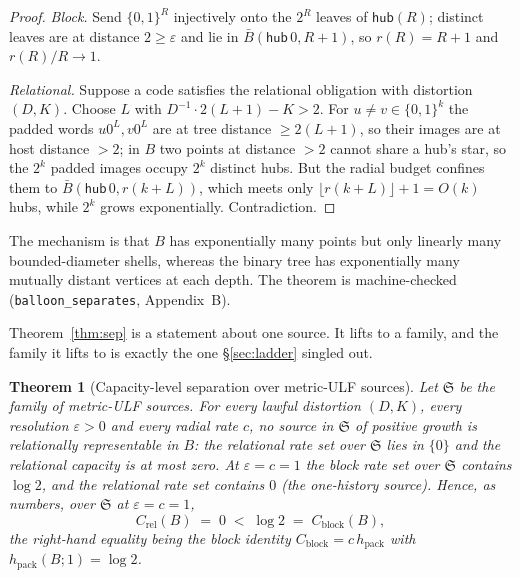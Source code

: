\documentclass[11pt,reqno]{amsart}
\theoremstyle{plain}
\newtheorem{theorem}{Theorem}[section]
\theoremstyle{definition}
\newcommand{\hpack}{h_{\mathrm{pack}}}
\newcommand{\Crel}{C_{\mathrm{rel}}}
\newcommand{\Cblock}{C_{\mathrm{block}}}
\newcommand{\eps}{\varepsilon}
\begin{document}
\begin{proof}
\emph{Block.} Send $\{0,1\}^R$ injectively onto the $2^R$ leaves of $\mathsf{hub}(R)$; distinct leaves are at distance $2\ge\eps$ and lie in $\bar B(\mathsf{hub}\,0,R+1)$, so $r(R)=R+1$ and $r(R)/R\to1$.

\emph{Relational.} Suppose a code satisfies the relational obligation with distortion $(D,K)$. Choose $L$ with $D^{-1}\cdot2(L+1)-K>2$. For $u\ne v\in\{0,1\}^k$ the padded words $u0^L,v0^L$ are at tree distance $\ge2(L+1)$, so their images are at host distance $>2$; in $B$ two points at distance $>2$ cannot share a hub's star, so the $2^k$ padded images occupy $2^k$ distinct hubs. But the radial budget confines them to $\bar B(\mathsf{hub}\,0,r(k+L))$, which meets only $\lfloor r(k+L)\rfloor+1=O(k)$ hubs, while $2^k$ grows exponentially. Contradiction.
\end{proof}

The mechanism is that $B$ has exponentially many points but only linearly many bounded-diameter shells, whereas the binary tree has exponentially many mutually distant vertices at each depth. The theorem is machine-checked (\texttt{balloon\_separates}, Appendix~B).

Theorem~\ref{thm:sep} is a statement about one source. It lifts to a family, and the family it lifts to is exactly the one \S\ref{sec:ladder} singled out.

\begin{theorem}[Capacity-level separation over metric-ULF sources]\label{thm:sepcap}
Let $\mathfrak S$ be the family of metric-ULF sources. For every lawful distortion $(D,K)$, every resolution $\eps>0$ and every radial rate $c$, no source in $\mathfrak S$ of positive growth is relationally representable in $B$: the relational rate set over $\mathfrak S$ lies in $\{0\}$ and the relational capacity is at most zero. At $\eps=c=1$ the block rate set over $\mathfrak S$ contains $\log2$, and the relational rate set contains $0$ (the one-history source). Hence, as numbers, over $\mathfrak S$ at $\eps=c=1$,
\[
\Crel(B)\;=\;0\;<\;\log2\;=\;\Cblock(B),
\]
the right-hand equality being the block identity $\Cblock=c\,\hpack$ with $\hpack(B;1)=\log2$.
\end{theorem}
\end{document}
